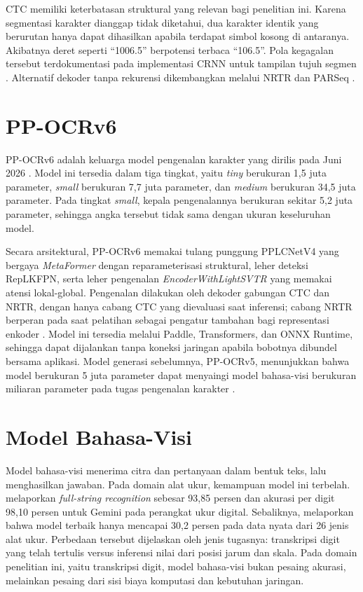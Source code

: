 CTC memiliki keterbatasan struktural yang relevan bagi penelitian ini. Karena
segmentasi karakter dianggap tidak diketahui, dua karakter identik yang
berurutan hanya dapat dihasilkan apabila terdapat simbol kosong di antaranya.
Akibatnya deret seperti ``1006.5'' berpotensi terbaca ``106.5''. Pola kegagalan
tersebut terdokumentasi pada implementasi CRNN untuk tampilan tujuh segmen
\parencite{oicws2026lcd}. Alternatif dekoder tanpa rekurensi dikembangkan
melalui NRTR \parencite{sheng2019nrtr} dan PARSeq
\parencite{bautista2022parseq}.

\section{PP-OCRv6}

PP-OCRv6 adalah keluarga model pengenalan karakter yang dirilis pada Juni 2026
\parencite{zhang2026ppocrv6}. Model ini tersedia dalam tiga tingkat, yaitu
\textit{tiny} berukuran 1,5 juta parameter, \textit{small} berukuran 7,7 juta
parameter, dan \textit{medium} berukuran 34,5 juta parameter. Pada tingkat
\textit{small}, kepala pengenalannya berukuran sekitar 5,2 juta parameter,
sehingga angka tersebut tidak sama dengan ukuran keseluruhan model.

Secara arsitektural, PP-OCRv6 memakai tulang punggung PPLCNetV4 yang bergaya
\textit{MetaFormer} dengan reparameterisasi struktural, leher deteksi RepLKFPN,
serta leher pengenalan \textit{EncoderWithLightSVTR} yang memakai atensi
lokal-global. Pengenalan dilakukan oleh dekoder gabungan CTC dan NRTR, dengan
hanya cabang CTC yang dievaluasi saat inferensi; cabang NRTR berperan pada saat
pelatihan sebagai pengatur tambahan bagi representasi enkoder
\parencite{zhang2026ppocrv6}. Model ini tersedia melalui Paddle, Transformers,
dan ONNX Runtime, sehingga dapat dijalankan tanpa koneksi jaringan apabila
bobotnya dibundel bersama aplikasi. Model generasi sebelumnya, PP-OCRv5,
menunjukkan bahwa model berukuran 5 juta parameter dapat menyaingi model
bahasa-visi berukuran miliaran parameter pada tugas pengenalan karakter
\parencite{zhang2026ppocrv5}.

\section{Model Bahasa-Visi}

Model bahasa-visi menerima citra dan pertanyaan dalam bentuk teks, lalu
menghasilkan jawaban. Pada domain alat ukur, kemampuan model ini terbelah.
\textcite{ega2026leveraging} melaporkan \textit{full-string recognition} sebesar
93,85 persen dan akurasi per digit 98,10 persen untuk Gemini pada perangkat ukur
digital. Sebaliknya, \textcite{lin2026measurebench} melaporkan bahwa model
terbaik hanya mencapai 30,2 persen pada data nyata dari 26 jenis alat ukur.
Perbedaan tersebut dijelaskan oleh jenis tugasnya: transkripsi digit yang telah
tertulis versus inferensi nilai dari posisi jarum dan skala. Pada domain
penelitian ini, yaitu transkripsi digit, model bahasa-visi bukan pesaing
akurasi, melainkan pesaing dari sisi biaya komputasi dan kebutuhan jaringan.

